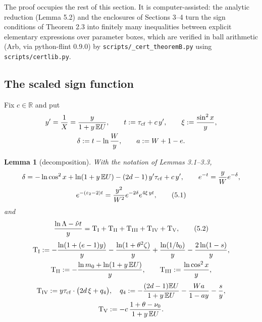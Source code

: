 \documentclass[11pt,a4paper]{article}
\newtheorem{lemma}[theorem]{Lemma}
\theoremstyle{definition}
\theoremstyle{remark}
\begin{document}
The proof occupies the rest of this section. It is computer-assisted: the analytic reduction (Lemma 5.2) and the enclosures of Sections 3–4 turn the sign conditions of Theorem 2.3 into finitely many inequalities between explicit elementary expressions over parameter boxes, which are verified in ball arithmetic (Arb, via python-flint 0.9.0) by \texttt{scripts/\_\allowbreak cert\_\allowbreak theoremB.py} using \texttt{scripts/\allowbreak certlib.py}.

\subsection{The scaled sign function}

Fix $c\in\mathbb R$ and put
\begin{gather*}
y'=\frac1X=\frac{y}{1+y\,\mathbb EU}, \qquad t:=\tau_{\rm cf}+c\,y', \qquad \xi:=\frac{\sin^2x}{y}, \\
\delta:=t-\ln\frac Wy, \qquad a:=W+1-e .
\end{gather*}

\begin{lemma}[{decomposition}]
With the notation of Lemmas 3.1–3.3,
\begin{gather*}
\delta=-\ln\cos^2x+\ln(1+y\,\mathbb EU)-(2d-1)\,y'\tau_{\rm cf}+c\,y', \qquad e^{-t}=\frac yWe^{-\delta}, \\
e^{-(\varepsilon_2-2)t}=\frac{y^2}{W^2}e^{-2\delta}e^{4\xi\,yt}, \tag{5.1}
\end{gather*}
and
\begin{equation*}
\frac{\ln\Lambda-\hat\nu t}{y}={\rm T_I}+{\rm T_{II}}+{\rm T_{III}}+{\rm T_{IV}}+{\rm T_V}, \tag{5.2}
\end{equation*}
\begin{gather*}
{\rm T_I}:=-\frac{\ln(1+(e-1)y)}{y}-\frac{\ln(1+\theta^2\zeta)}{y}+\frac{\ln(1/b_0)}{y}-\frac{2\ln(1-s)}{y}, \\
{\rm T_{II}}:=-\frac{\ln m_0+\ln(1+y\,\mathbb EU)}{y}, \qquad {\rm T_{III}}:=\frac{\ln\cos^2x}{y},
\end{gather*}
\begin{gather*}
{\rm T_{IV}}:=y\tau_{\rm cf}\cdot\bigl(2d\,\xi+q_4\bigr),\quad q_4:=-\frac{(2d-1)\mathbb EU}{1+y\,\mathbb EU}-\frac{Wa}{1-ay}-\frac sy, \\
{\rm T_V}:=-c\,\frac{1+\theta-\nu_0}{1+y\,\mathbb EU}.
\end{gather*}
\end{lemma}
\end{document}
